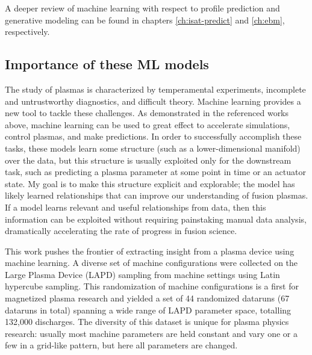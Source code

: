 A deeper review of machine learning with respect to profile prediction and generative modeling can be found in chapters \ref{ch:isat-predict} and \ref{ch:ebm}, respectively.

\subsection{Importance of these ML models}

The study of plasmas is characterized by temperamental experiments, incomplete and untrustworthy diagnostics, and difficult theory. Machine learning provides a new tool to tackle these challenges. As demonstrated in the referenced works above, machine learning can be used to great effect to accelerate simulations, control plasmas, and make predictions. In order to successfully accomplish these tasks, these models learn some structure (such as a lower-dimensional manifold) over the data, but this structure is usually exploited only for the downstream task, such as predicting a plasma parameter at some point in time or an actuator state. My goal is to make this structure explicit and explorable; the model has likely learned relationships that can improve our understanding of fusion plasmas. If a model learns relevant and useful relationships from data, then this information can be exploited without requiring painstaking manual data analysis, dramatically accelerating the rate of progress in fusion science.

This work pushes the frontier of extracting insight from a plasma device using machine learning. A diverse set of machine configurations were collected on the Large Plasma Device (LAPD) sampling from machine settings using Latin hypercube sampling. This randomization of machine configurations is a first for magnetized plasma research and yielded a set of 44 randomized dataruns (67 dataruns in total) spanning a wide range of LAPD parameter space, totalling 132,000 discharges. The diversity of this dataset is unique for plasma physics research: usually most machine parameters are held constant and vary one or a few in a grid-like pattern, but here all parameters are changed. 

